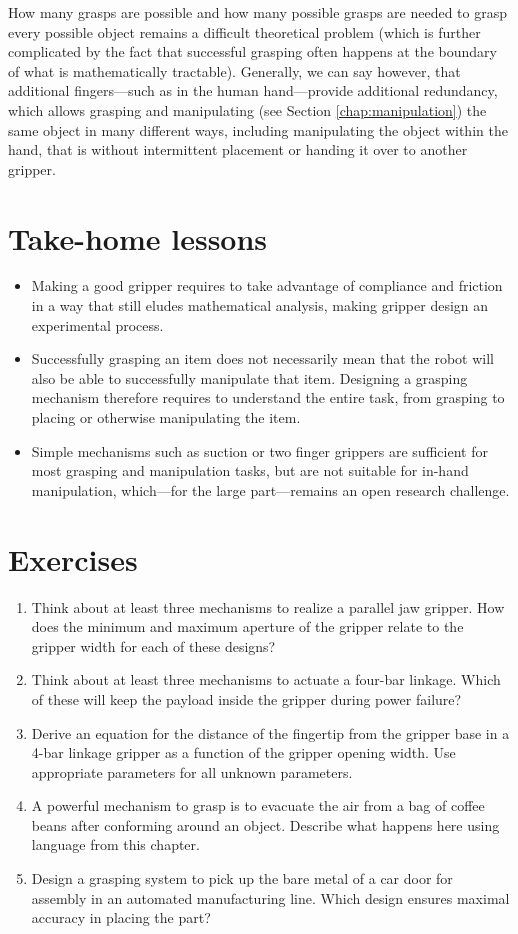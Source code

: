 How many grasps are possible and how many possible grasps are needed to grasp every possible object remains a difficult theoretical problem (which is further complicated by the fact that successful grasping often happens at the boundary of what is mathematically tractable). Generally, we can say however, that additional fingers---such as in the human hand---provide additional redundancy, which allows grasping and manipulating (see Section \ref{chap:manipulation}) the same object in many different ways, including manipulating the object within the hand, that is without intermittent placement or handing it over to another gripper.

\section*{Take-home lessons}
\begin{itemize}
\item Making a good gripper requires to take advantage of compliance and friction in a way that still eludes mathematical analysis, making gripper design an experimental process.
\item Successfully grasping an item does not necessarily mean that the robot will also be able to successfully manipulate that item. Designing a grasping mechanism therefore requires to understand the entire task, from grasping to placing or otherwise manipulating the item. 
\item Simple mechanisms such as suction or two finger grippers are sufficient for most grasping and manipulation tasks, but are not suitable for in-hand manipulation, which---for the large part---remains an open research challenge.
\end{itemize}


\section*{Exercises}\small
\begin{enumerate}
\item Think about at least three mechanisms to realize a parallel jaw gripper. How does the minimum and maximum aperture of the gripper relate to the gripper width for each of these designs?
\item Think about at least three mechanisms to actuate a four-bar linkage. Which of these will keep the payload inside the gripper during power failure?
\item Derive an equation for the distance of the fingertip from the gripper base in a 4-bar linkage gripper as a function of the gripper opening width. Use appropriate parameters for all unknown parameters.
\item A powerful mechanism to grasp is to evacuate the air from a bag of coffee beans after conforming around an object. Describe what happens here using language from this chapter.
\item Design a grasping system to pick up the bare metal of a car door for assembly in an automated manufacturing line. Which design ensures maximal accuracy in placing the part? 
\end{enumerate}\normalsize
